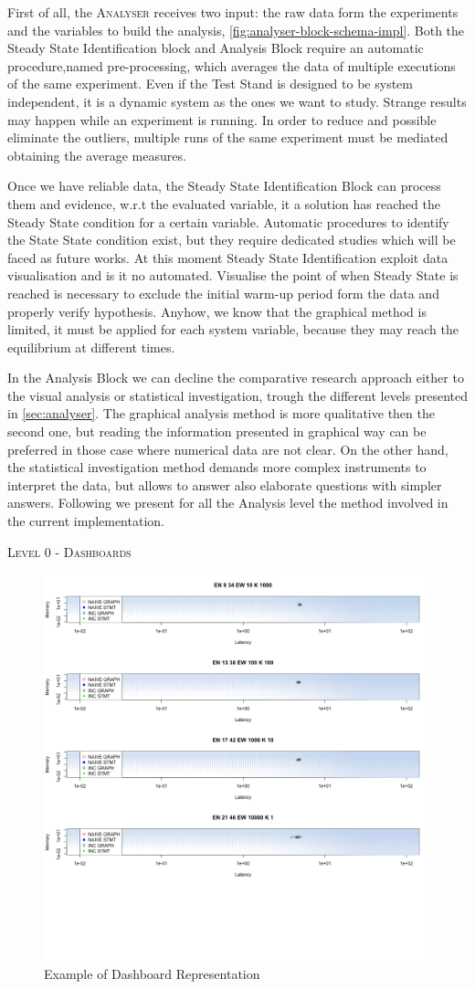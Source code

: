 First of all, the \textsc{Analyser} receives two input: the raw data form the experiments and the variables to build the analysis, \ref{fig:analyser-block-schema-impl}. Both the Steady State Identification block and Analysis Block require an automatic procedure,named pre-processing, which averages the data of multiple executions of the same experiment. Even if the Test Stand is designed to be system independent, it is a dynamic system as the ones we want to study. Strange results may happen while an experiment is running. In order to reduce and possible eliminate the outliers, multiple runs of the same experiment must be mediated obtaining the average measures. 


Once we have reliable data, the Steady State Identification Block can process them and evidence, w.r.t the evaluated variable, it a solution has reached the Steady State condition for a certain variable. Automatic procedures to identify the State State condition exist, but they require dedicated studies which will be faced as future works. At this moment Steady State Identification exploit data visualisation and is it no automated. Visualise the point of when Steady State is reached is necessary to exclude the initial warm-up period form the data and properly verify hypothesis. Anyhow, we know that the graphical method is limited, it must be applied for each system variable, because they may reach the equilibrium at different times.


In the Analysis Block we can decline the comparative research approach either to the visual analysis or statistical investigation, trough the different levels presented in \ref{sec:analyser}. The graphical analysis method is more qualitative then the second one, but reading the information presented in graphical way can be preferred in those case where numerical data are not clear. On the other hand, the statistical investigation method demands more complex instruments to interpret the data, but allows to answer also elaborate questions with simpler answers. Following we present for all the Analysis level the method involved in the current implementation.

\pagebreak


\textsc{Level 0 - Dashboards}

\begin{figure}[tbh]
  \centering
	\includegraphics[width=0.45\linewidth]{images/dashboard-example}
	\caption{Example of Dashboard Representation} 
  	\label{fig:dashboard-example}
\end{figure}


